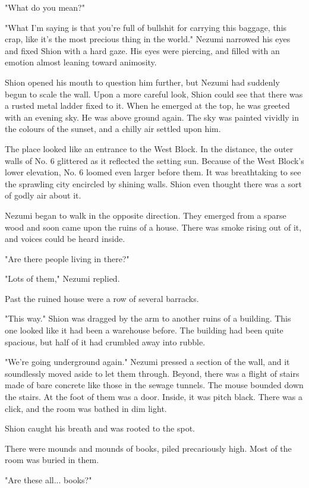 "What do you mean?"

"What I'm saying is that you're full of bullshit for carrying this
baggage, this crap, like it's the most precious thing in the world."
Nezumi narrowed his eyes and fixed Shion with a hard gaze. His eyes were
piercing, and filled with an emotion almost leaning toward animosity.

Shion opened his mouth to question him further, but Nezumi had suddenly
begun to scale the wall. Upon a more careful look, Shion could see that
there was a rusted metal ladder fixed to it. When he emerged at the top,
he was greeted with an evening sky. He was above ground again. The sky
was painted vividly in the colours of the sunset, and a chilly air
settled upon him.

The place looked like an entrance to the West Block. In the distance,
the outer walls of No. 6 glittered as it reflected the setting sun.
Because of the West Block's lower elevation, No. 6 loomed even larger
before them. It was breathtaking to see the sprawling city encircled by
shining walls. Shion even thought there was a sort of godly air about
it.

Nezumi began to walk in the opposite direction. They emerged from a
sparse wood and soon came upon the ruins of a house. There was smoke
rising out of it, and voices could be heard inside.

"Are there people living in there?"

"Lots of them," Nezumi replied.

Past the ruined house were a row of several barracks.

"This way." Shion was dragged by the arm to another ruins of a building.
This one looked like it had been a warehouse before. The building had
been quite spacious, but half of it had crumbled away into rubble.

"We're going underground again." Nezumi pressed a section of the wall,
and it soundlessly moved aside to let them through. Beyond, there was a
flight of stairs made of bare concrete like those in the sewage tunnels.
The mouse bounded down the stairs. At the foot of them was a door.
Inside, it was pitch black. There was a click, and the room was bathed
in dim light.

Shion caught his breath and was rooted to the spot.

There were mounds and mounds of books, piled precariously high. Most of
the room was buried in them.

"Are these all... books?"

